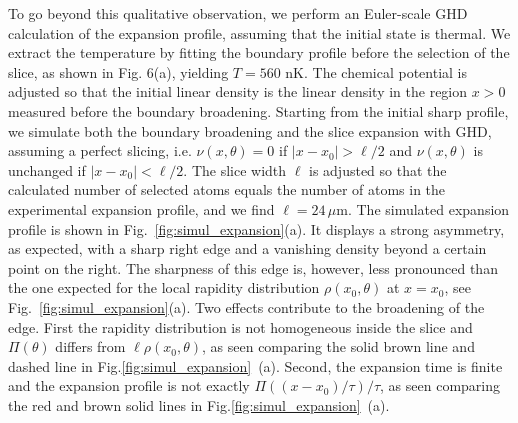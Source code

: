 		
		To go beyond this qualitative observation, we perform an Euler-scale GHD calculation
		of the expansion profile, assuming that the initial state is thermal. We extract the temperature by fitting the boundary profile before the selection of the slice, as shown in Fig. 6(a),  
        yielding $T=560$ nK.
        The chemical potential is adjusted so that the initial linear density is the linear density
        in the region $x>0$ measured before the boundary broadening.
		  Starting from the initial sharp profile, we simulate both the boundary broadening and the slice expansion with GHD, assuming a perfect slicing, i.e. $\nu(x,\theta)=0$ if $|x-x_0|>\ell/2$ and $\nu(x,\theta)$ is unchanged if $|x-x_0|<\ell/2$. The slice width $\ell$ is adjusted so that the calculated number of selected atoms equals  
		 the number of atoms in the experimental expansion profile, and we find $\ell= 24 \,\mu$m. %
		The simulated expansion profile is shown in Fig.~\ref{fig:simul_expansion}(a). It displays a strong asymmetry, as expected, with a sharp right edge and a vanishing density beyond a certain point on the right. The sharpness of this edge is, however, less pronounced than the one expected for the local rapidity distribution $\rho(x_0,\theta)$ at $x=x_0$, see Fig.~\ref{fig:simul_expansion}(a). Two effects contribute to the broadening of  the  edge. First the rapidity distribution is not homogeneous inside the slice and $\Pi(\theta)$ differs from $\ell \rho(x_0,\theta)$, as seen comparing the 
		solid brown line and dashed line in Fig.\ref{fig:simul_expansion}~(a). Second, the expansion time is finite and the expansion profile is not exactly $\Pi((x-x_0)/\tau)/\tau$, as seen comparing the 
		red  and brown  solid lines in Fig.\ref{fig:simul_expansion}~(a).
		
